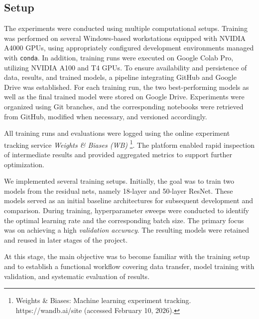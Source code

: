 \subsection{Setup}
The experiments were conducted using multiple computational setups. 
Training was performed on several Windows-based workstations equipped with NVIDIA A4000 GPUs, using appropriately configured development environments managed with \texttt{conda}. 
In addition, training runs were executed on Google Colab Pro, utilizing NVIDIA A100 and T4 GPUs. 
To ensure availability and persistence of data, results, and trained models, a pipeline integrating GitHub and Google Drive was established. 
For each training run, the two best-performing models as well as the final trained model were stored on Google Drive. 
Experiments were organized using Git branches, and the corresponding notebooks were retrieved from GitHub, modified when necessary, and versioned accordingly.

All training runs and evaluations were logged using the online experiment tracking service \textit{Weights \& Biases (WB)}%
\footnote{Weights \& Biases: Machine learning experiment tracking. https://wandb.ai/site (accessed February 10, 2026).}. 
The platform enabled rapid inspection of intermediate results and provided aggregated metrics to support further optimization.

We implemented several training setups. 
Initially, the goal was to train two models from the residual nets, namely 18-layer and 50-layer ResNet. 
These models served as an initial baseline architectures for subsequent development and comparison. 
During training, hyperparameter sweeps were conducted to identify the optimal learning rate and the corresponding batch size. 
The primary focus was on achieving a high \textit{validation accuracy}. 
The resulting models were retained and reused in later stages of the project.

At this stage, the main objective was to become familiar with the training setup and to establish a functional workflow covering data transfer, model training with validation, and systematic evaluation of results.
